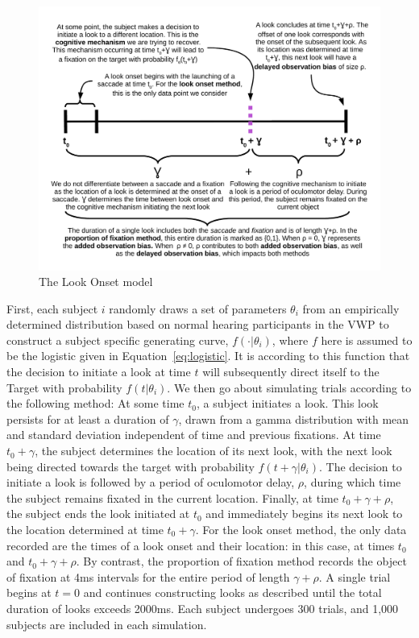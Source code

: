 \documentclass{article}
\begin{document}
\begin{figure}[H]
\centering
\includegraphics[width=\textwidth]{anatomy_of_look.pdf}
\caption{The Look Onset model}
\label{fig:anatomy_of_look}
\end{figure}


First, each subject $i$ randomly draws a set of parameters $\theta_i$ from an empirically determined distribution based on normal hearing participants in the VWP \cite{FarrisTrimble2014} to construct a subject specific generating curve, $f(\cdot | \theta_i)$, where $f$ here is assumed to be the logistic given in Equation~\ref{eq:logistic}.  It is according to this function that the decision to initiate a look at time $t$ will subsequently direct itself to the Target with probability $f(t|\theta_i)$. We then go about simulating trials according to the following method: At some time $t_0$, a subject initiates a look. This look persists for at least a duration of $\gamma$, drawn from a gamma distribution with mean and standard deviation independent of time and previous fixations. At time $t_0+\gamma$, the subject determines the location of its next look, with the next look being directed towards the target with probability $f(t+\gamma | \theta_i)$. The decision to initiate a look is followed by a period of oculomotor delay, $\rho$, during which time the subject remains fixated in the current location. Finally, at time $t_0 + \gamma + \rho$, the subject ends the look initiated at $t_0$ and immediately begins its next look to the location determined at time $t_0 + \gamma$. For the look onset method, the only data recorded are the times of a look onset and their location: in this case, at times $t_0$ and $t_0 + \gamma + \rho$. By contrast, the proportion of fixation method records the object of fixation at 4ms intervals for the entire period of length $\gamma + \rho$. A single trial begins at $t = 0$ and continues constructing looks as described until the total duration of looks exceeds 2000ms. Each subject undergoes 300 trials, and 1,000 subjects are included in each simulation.
\end{document}

